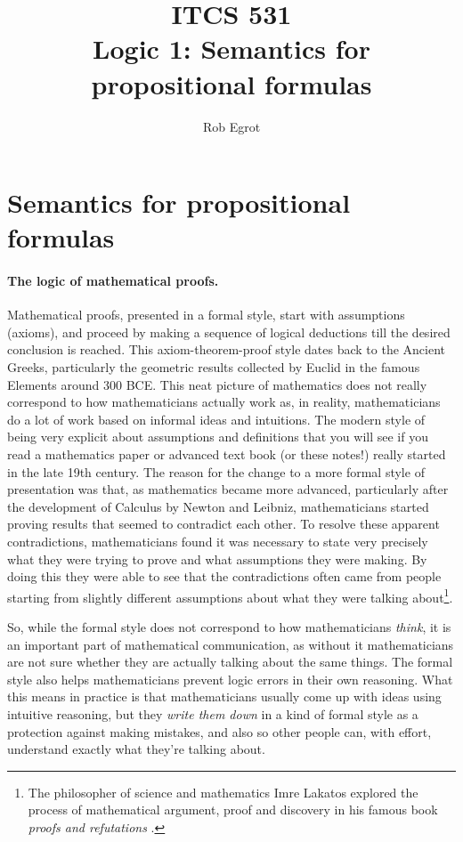 \documentclass{article}
\title{ITCS 531 \\Logic 1: Semantics for propositional formulas}
\author{Rob Egrot}
\date{}
\theoremstyle{plain}
\begin{document}
\maketitle

\section{Semantics for propositional formulas}
\paragraph{The logic of mathematical proofs.} Mathematical proofs, presented in a formal style, start with assumptions (axioms), and proceed by making a sequence of logical deductions till the desired conclusion is reached. This axiom-theorem-proof style dates back to the Ancient Greeks, particularly the geometric results collected by Euclid in the famous Elements around 300 BCE. This neat picture of mathematics does not really correspond to how mathematicians actually work as, in reality, mathematicians do a lot of work based on informal ideas and intuitions. The modern style of being very explicit about assumptions and definitions that you will see if you read a mathematics paper or advanced text book (or these notes!) really started in the late 19th century. The reason for the change to a more formal style of presentation was that, as mathematics became more advanced, particularly after the development of Calculus by Newton and Leibniz, mathematicians started proving results that seemed to contradict each other. To resolve these apparent contradictions, mathematicians found it was necessary to state very precisely what they were trying to prove and what assumptions they were making. By doing this they were able to see that the contradictions often came from people starting from slightly different assumptions about what they were talking about\footnote{The philosopher of science and mathematics Imre Lakatos explored the process of mathematical argument, proof and discovery in his famous book \emph{proofs and refutations} \cite{Lak76}.}.

So, while the formal style does not correspond to how mathematicians \emph{think}, it is an important part of mathematical communication, as without it mathematicians are not sure whether they are actually talking about the same things. The formal style also helps mathematicians prevent logic errors in their own reasoning. What this means in practice is that mathematicians usually come up with ideas using intuitive reasoning, but they \emph{write them down} in a kind of formal style as a protection against making mistakes, and also so other people can, with effort, understand exactly what they're talking about. 
\end{document}
